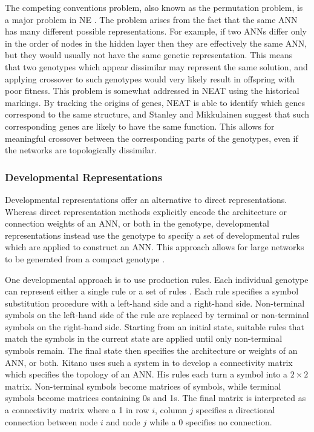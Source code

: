 \documentclass[12pt]{article} %
\begin{document}
The competing conventions problem, also known as the permutation problem, is a major problem in NE \cite{Floreano2008}\cite{Stanley2002}\cite{Yao1999}. The problem arises from the fact that the same ANN has many different possible representations. For example, if two ANNs differ only in the order of nodes in the hidden layer then they are effectively the same ANN, but they would usually not have the same genetic representation. This means that two genotypes which appear dissimilar may represent the same solution, and applying crossover to such genotypes would very likely result in offspring with poor fitness. This problem is somewhat addressed in NEAT using the historical markings. By tracking the origins of genes, NEAT is able to identify which genes correspond to the same structure, and Stanley and Mikkulainen suggest that such corresponding genes are likely to have the same function. This allows for meaningful crossover between the corresponding parts of the genotypes, even if the networks are topologically dissimilar.

\subsubsection{Developmental Representations}

Developmental representations offer an alternative to direct representations. Whereas direct representation methods explicitly encode the architecture or connection weights of an ANN, or both in the genotype, developmental representations instead use the genotype to specify a set of developmental rules which are applied to construct an ANN. This approach allows for large networks to be generated from a compact genotype \cite{Floreano2008}\cite{Yao1999}.

One developmental approach is to use production rules. Each individual genotype can represent either a single rule or a set of rules \cite{Yao1999}. Each rule specifies a symbol substitution procedure with a left-hand side and a right-hand side. Non-terminal symbols on the left-hand side of the rule are replaced by terminal or non-terminal symbols on the right-hand side. Starting from an initial state, suitable rules that match the symbols in the current state are applied until only non-terminal symbols remain. The final state then specifies the architecture or weights of an ANN, or both. Kitano uses such a system in \cite{Kitano1990} to develop a connectivity matrix which specifies the topology of an ANN. His rules each turn a symbol into a $2\times{}2$ matrix. Non-terminal symbols become matrices of symbols, while terminal symbols become matrices containing 0s and 1s. The final matrix is interpreted as a connectivity matrix where a 1 in row $i$, column $j$ specifies a directional connection between node $i$ and node $j$ while a 0 specifies no connection.
\end{document}
